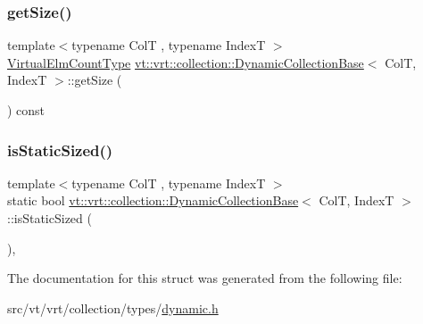 \subsubsection{\texorpdfstring{get\+Size()}{getSize()}}
{\footnotesize\ttfamily template$<$typename ColT , typename IndexT $>$ \\
\hyperlink{namespacevt_ac115668758184050beff7a9281a2c490}{Virtual\+Elm\+Count\+Type} \hyperlink{structvt_1_1vrt_1_1collection_1_1_dynamic_collection_base}{vt\+::vrt\+::collection\+::\+Dynamic\+Collection\+Base}$<$ ColT, IndexT $>$\+::get\+Size (\begin{DoxyParamCaption}{ }\end{DoxyParamCaption}) const\hspace{0.3cm}{\ttfamily [inline]}}

\mbox{\label{structvt_1_1vrt_1_1collection_1_1_dynamic_collection_base_ac0d47ae78d2be280bcdd4b4b80306396}} 
\subsubsection{\texorpdfstring{is\+Static\+Sized()}{isStaticSized()}}
{\footnotesize\ttfamily template$<$typename ColT , typename IndexT $>$ \\
static bool \hyperlink{structvt_1_1vrt_1_1collection_1_1_dynamic_collection_base}{vt\+::vrt\+::collection\+::\+Dynamic\+Collection\+Base}$<$ ColT, IndexT $>$\+::is\+Static\+Sized (\begin{DoxyParamCaption}{ }\end{DoxyParamCaption})\hspace{0.3cm}{\ttfamily [inline]}, {\ttfamily [static]}}



The documentation for this struct was generated from the following file\+:\begin{DoxyCompactItemize}
\item 
src/vt/vrt/collection/types/\hyperlink{dynamic_8h}{dynamic.\+h}\end{DoxyCompactItemize}
